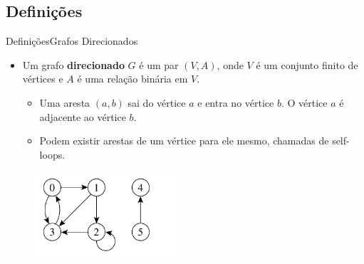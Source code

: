 \documentclass[aspectratio=169]{beamer}
\begin{document}
\subsection{Definições}

\begin{frame}{Definições}{Grafos Direcionados}
\begin{itemize}
\item Um grafo {\bf direcionado} $G$ é um par $(V, A)$, onde $V$ é um conjunto finito de vértices e $A$ é uma relação binária em $V$.
\begin{itemize}
\item Uma aresta $(a, b)$ sai do vértice $a$ e entra no vértice $b$. O vértice $a$ é adjacente ao vértice $b$.
\item Podem existir arestas de um vértice para ele mesmo, chamadas de self-loops.
\end{itemize}
\end{itemize}
\begin{figure}[!h]
  \centering
  \includegraphics[width=150pt]{imagens/exemplo_grafo_direcionado.png}
  \label{fig_exemplo_grafo_direcionado}
\end{figure}
\end{frame}

\end{document}
